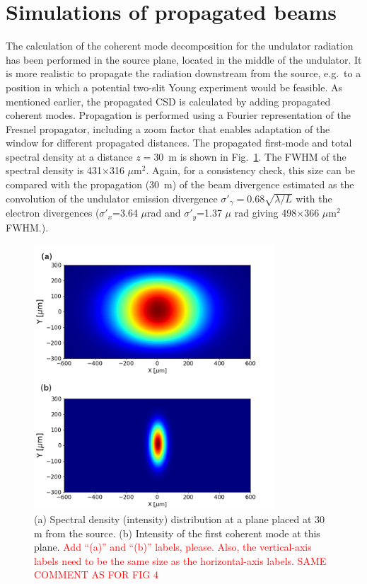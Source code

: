 \documentclass[%
 reprint,
 amsmath,amssymb,
 aps,
]{revtex4-1}
\begin{document}
\section{Simulations of propagated beams}

The calculation of the coherent mode decomposition for the undulator radiation has been performed in the source plane, located in the middle of the undulator. It is more realistic to propagate the radiation downstream from the source, e.g.~to a position in which a potential two-slit Young experiment would be feasible. As mentioned earlier, the propagated CSD is calculated by adding  propagated coherent modes. Propagation is performed using a Fourier representation of the Fresnel propagator, including a zoom factor \cite{schmidt,pirro} that enables adaptation of the window for different propagated distances. The propagated first-mode and total spectral density at a distance $z=30$~m is shown in Fig.~\ref{spectral_density_propagated}. The FWHM of the spectral density is 431$\times$316 $\mu$m$^2$. Again, for a consistency check, this size can be compared with the propagation (30~m) of the beam divergence estimated as the convolution of the undulator emission divergence $\sigma'_\gamma=0.68\sqrt{\lambda/L}$ with the electron divergences ($\sigma'_x$=3.64 $\mu$rad and $\sigma'_y$=1.37 $\mu$ rad giving 498$\times$366 $\mu$m$^2$ FWHM.). 

\begin{figure}
\includegraphics[width=9.0cm]{Figures/spectral_density_propagated.png}
\caption{(a) Spectral density (intensity) distribution at a plane placed at 30 m from the source. (b) Intensity of the first coherent mode at this plane. \textcolor{red}{Add ``(a)'' and ``(b)'' labels, please.  Also, the vertical-axis labels need to be the same size as the horizontal-axis labels. SAME COMMENT AS FOR FIG 4}}
\label{spectral_density_propagated}%
\end{figure}
\end{document}
